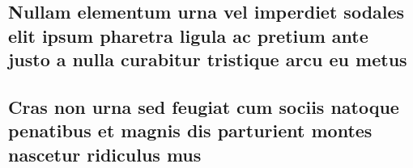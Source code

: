 \documentclass[
	article,			%
	11pt,				%
	oneside,			%
	a4paper,			%
	english,			%
	brazil,				%
	sumario=tradicional
	]{abntex2}
\begin{document}

\newpage


%
%

\newpage
\begin{apendicesenv}

\chapter{Nullam elementum urna vel imperdiet sodales elit ipsum pharetra ligula
ac pretium ante justo a nulla curabitur tristique arcu eu metus}
\lipsum[55-57]

\end{apendicesenv}

\newpage
\begin{anexosenv}

\chapter{Cras non urna sed feugiat cum sociis natoque penatibus et magnis dis
parturient montes nascetur ridiculus mus}

\lipsum[31]

\end{anexosenv}
\end{document}
